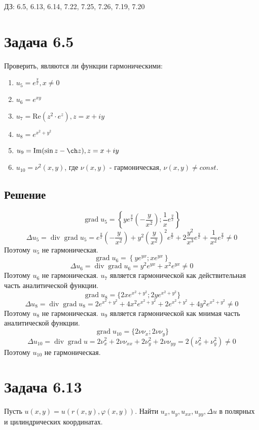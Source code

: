 \documentclass[11pt]{article}
\author{Sergey Makarov}
\date{\today}
\title{}
\def\zall{\setcounter{lem}{0}\setcounter{cnsqnc}{0}\setcounter{th}{0}\setcounter{Cmt}{0}\setcounter{equation}{0}}
\newcounter{lem}\setcounter{lem}{0}
\newcounter{th}\setcounter{th}{0}
\newcounter{cnsqnc}\setcounter{cnsqnc}{0}
\newcounter{Cmt}\setcounter{Cmt}{0}
\renewcommand{\div}{\operatorname{div}}
\newcommand{\grad}{\operatorname{grad}}
\begin{document}
\zall

ДЗ: 6.5, 6.13, 6.14, 7.22, 7.25, 7.26, 7.19, 7.20
\section{Задача 6.5}
\label{sec:org8a04a17}
Проверить, являются ли функции гармоническими:
\begin{enumerate}
\item \(u_5 = e^{\frac{y}x}, x \neq 0\)
\item \(u_6 = e^{xy}\)
\item \(u_7 = \mathrm{Re}(z^2\cdot e^z), z = x + iy\)
\item \(u_8 = e^{x^2 + y^2}\)
\item \(u_9 = \mathrm{Im}(\sin z - \ch z), z = x + iy\)
\item \(u_{10} = \nu^2(x, y)\), где \(\nu(x, y)\) - гармоническая, \(\nu(x, y) \neq const\).
\end{enumerate}
\subsection{Решение}
\label{sec:org516641a}
$$\grad u_5 = \left\{ye^{\frac{y}x}\left(-\frac{y}{x^2}\right); \frac1xe^{\frac{y}x}\right\}$$
$$\Delta u_5 = \div\grad u_5 = e^{\frac{y}x}\left(-\frac{y}{x^2}\right) + y^2\left(\frac{y}{x^2}\right)^2e^{\frac{y}x} + 2\frac{y^2}{x^3}e^{\frac{y}x} + \frac1{x^2}e^{\frac{y}x} \neq 0$$
Поэтому $u_5$ не гармоническая.
$$\grad u_6 = \left\{ye^{yx}; xe^{yx}\right\}$$
$$\Delta u_6 = \div\grad u_6 = y^2e^{yx} + x^2e^{yx} \neq 0$$
Поэтому $u_6$ не гармоническая.
$u_7$ является гармонической как действительная часть аналитической функции.
$$\grad u_8 = \{2xe^{x^2 + y^2}; 2ye^{x^2 + y^2}\}$$
$$\Delta u_8 = \div\grad u_8 = 2e^{x^2 + y^2} + 4x^2e^{x^2 + y^2} + 2e^{x^2 + y^2} + 4y^2e^{x^2 + y^2} \neq 0$$
Поэтому $u_8$ не гармоническая.
$u_9$ является гармонической как мнимая часть аналитической функции.
$$\grad u_{10} = \{2\nu\nu_x; 2\nu\nu_y\}$$
$$\Delta u_{10} = \div\grad u = 2\nu_x^2 + 2\nu\nu_{xx} + 2\nu_y^2 + 2\nu\nu_{yy} = 2(\nu_x^2 + \nu_y^2) \neq 0$$
Поэтому $u_{10}$ не гармоническая.
\section{Задача 6.13}
\label{sec:orgbb2ca6c}
Пусть $u(x, y) = u(r(x, y), \varphi(x, y))$. Найти $u_x, u_y, u_{xx}, u_{yy}, \Delta u$ в
полярных и цилиндрических координатах.
\end{document}

